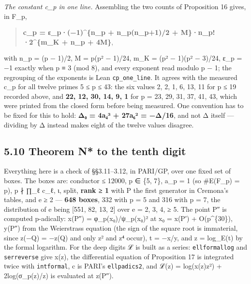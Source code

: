 \documentclass[11pt,a4paper]{article}
\theoremstyle{named}
\begin{document}
\textit{The constant c\_p in one line.} Assembling the two counts of Proposition 16 gives, in F\_p,

\begin{quote}
\textbf{c\_p = ε\_p·(−1)\textasciicircum{}\{n\_p + n\_p(n\_p+1)/2 + M\}·n\_p!·2\textasciicircum{}\{m\_K + n\_p + 4M\}},
\end{quote}

with n\_p = (p − 1)/2, M = p(p² − 1)/24, m\_K = (p² − 1)(p² − 3)/24, ε\_p = −1 exactly when p ≡ 3 (mod 8), and every exponent read modulo p − 1; the regrouping of the exponents is Lean \texttt{cp\_\allowbreak{}one\_\allowbreak{}line}. It agrees with the measured c\_p for all twelve primes 5 ≤ p ≤ 43: the six values 2, 2, 1, 6, 13, 11 for p ≤ 19 recorded above, and \textbf{22, 12, 30, 14, 9, 1} for p = 23, 29, 31, 37, 41, 43, which were printed from the closed form before being measured. One convention has to be fixed for this to hold: \textbf{Δ₀ = 4a₄³ + 27a₆² = −Δ/16}, and not Δ itself — dividing by Δ instead makes eight of the twelve values disagree.

\subsection*{5.10 Theorem N* to the tenth digit}

Everything here is a check of §§3.11–3.12, in PARI/GP, over one fixed set of boxes. The boxes are: conductor ≤ 12000, p ∈ \{5, 7\}, a\_p = 1 (so \#E(F\_p) = p), p ∤ ∏\_ℓ c\_ℓ, ι, split, \textbf{rank ≥ 1} with P the first generator in Cremona's tables, and e ≥ 2 — \textbf{648 boxes}, 332 with p = 5 and 316 with p = 7, the distribution of e being [551, 82, 13, 2] over e = 2, 3, 4, ≥ 5. The point P″ is computed p-adically: x(P″) = φ\_p(x₀)/ψ\_p(x₀)² at x₀ = x(P′) + O(p\textasciicircum{}\{30\}), y(P″) from the Weierstrass equation (the sign of the square root is immaterial, since z(−Q) = −z(Q) and only z² and z⁴ occur), t = −x/y, and z = log\_E(t) by the formal logarithm. For the deep digits ℒ is built as a series: \texttt{ellformallog} and \texttt{serreverse} give x(z), the differential equation of Proposition 17 is integrated twice with \texttt{intformal}, c is PARI's \texttt{ellpadics2}, and ℒ(z) = log(x(z)z²) + 2log(σ\_p(z)/z) is evaluated at z(P″).
\end{document}
